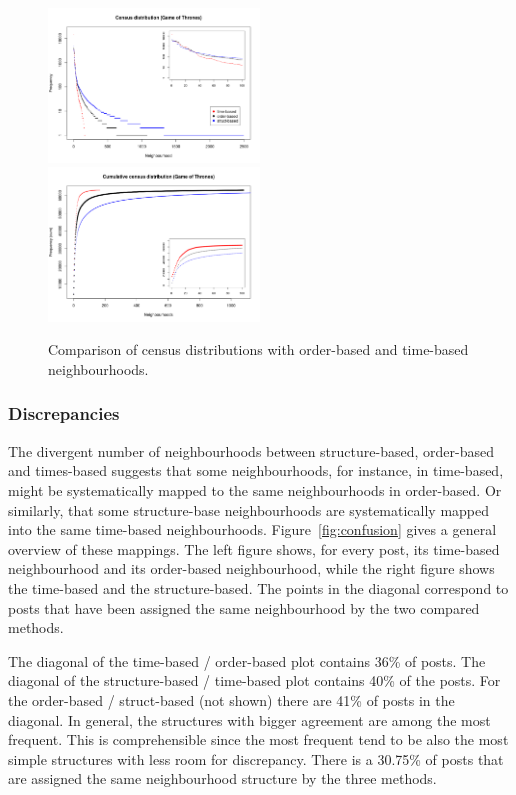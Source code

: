 \documentclass[conference]{IEEEtran}
\begin{document}
\begin{figure}
\centering
\includegraphics[width=0.5\textwidth]{compare_census_distribution_gameofthones}%
\includegraphics[width=0.5\textwidth]{compare_census_distribution_gameofthones_cum}
\caption{Comparison of census distributions with order-based and time-based neighbourhoods.}
\label{fig:census_distributions}
\end{figure}

\subsubsection{Discrepancies}
The divergent number of neighbourhoods between structure-based, order-based and times-based suggests that some neighbourhoods, for instance, in time-based, might be systematically mapped to the same neighbourhoods in order-based. Or similarly, that some structure-base neighbourhoods are systematically mapped into the same time-based neighbourhoods. Figure~\ref{fig:confusion} gives a general overview of these mappings. The left figure shows, for every post, its time-based neighbourhood and its order-based neighbourhood, while the right figure shows the time-based and the structure-based. The points in the diagonal correspond to posts that have been assigned the same neighbourhood by the two compared methods. 

The diagonal of the time-based / order-based plot contains 36\% of posts. The diagonal of the structure-based / time-based plot contains 40\% of the posts. For the order-based / struct-based (not shown) there are 41\% of posts in the diagonal. In general, the structures with bigger agreement are among the most frequent. This is comprehensible since the most frequent tend to be also the most simple structures with less room for discrepancy. There is a 30.75\% of posts that are assigned the same neighbourhood structure by the three methods. 
\end{document}
